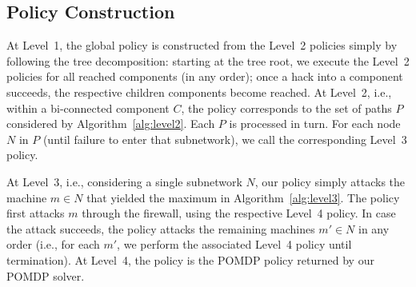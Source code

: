\subsection{Policy Construction} 


At Level~1, the global policy is constructed from the Level~2 policies
simply by following the tree decomposition: starting at the tree root,
we execute the Level~2 policies for all reached components (in any
order); once a hack into a component succeeds, the respective children
components become reached. At Level~2, i.e., within a bi-connected
component $C$, the policy corresponds to the set of paths $P$
considered by Algorithm~\ref{alg:level2}. Each $P$ is processed in
turn. For each node $N$ in $P$ (until failure to enter that
subnetwork), we call the corresponding Level~3 policy.

At Level~3, i.e., considering a single subnetwork $N$, our policy
simply attacks the machine $m \in N$ that yielded the maximum in
Algorithm~\ref{alg:level3}. The policy first attacks $m$ through the
firewall, using the respective Level~4 policy. In case the attack
succeeds, the policy attacks the remaining machines $m' \in N$ in any
order (i.e., for each $m'$, we perform the associated Level~4 policy
until termination). At Level~4, the policy is the POMDP policy
returned by our POMDP solver.



